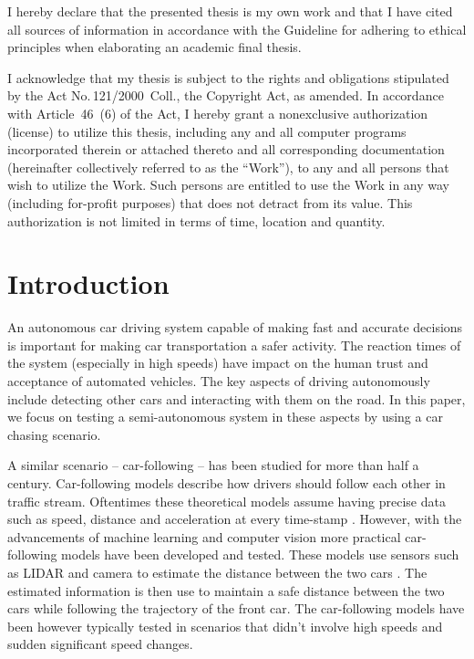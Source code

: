 \begin{declaration}
		I hereby declare that the presented thesis is my own work and that I have cited all sources of information in accordance with the Guideline for adhering to ethical principles when elaborating an academic final thesis.
		
		I acknowledge that my thesis is subject to the rights and obligations stipulated by the Act No.\,121/2000~Coll., the Copyright Act, as amended. In accordance with Article~46~(6) of the Act, I hereby grant a nonexclusive authorization (license) to utilize this thesis, including any and all computer programs incorporated therein or attached thereto and all corresponding documentation (hereinafter collectively referred to as the ``Work''), to any and all persons that wish to utilize the Work. Such persons are entitled to use the Work in any way (including for-profit purposes) that does not detract from its value. This authorization is not limited in terms of time, location and quantity.
\end{declaration}





\maketitle

\chapter{Introduction}
An autonomous car driving system capable of making fast and accurate decisions is important for making car transportation a safer activity. The reaction times of the system (especially in high speeds) have impact on the human trust and acceptance of automated vehicles. The key aspects of driving autonomously include detecting other cars and interacting with them on the road. In this paper, we focus on testing a semi-autonomous system in these aspects by using a car chasing scenario. \par

A similar scenario -- car-following -- has been studied for more than half a century. Car-following models describe how drivers should follow each other in traffic stream. Oftentimes these theoretical models assume having precise data such as speed, distance and acceleration at every time-stamp \cite{car_following}. However, with the advancements of machine learning and computer vision more practical car-following models have been developed and tested. These models use sensors such as LIDAR and camera to estimate the distance between the two cars \cite{lidar_highway}. The estimated information is then use to maintain a safe distance between the two cars while following the trajectory of the front car. The car-following models have been however typically tested in scenarios that didn't involve high speeds and sudden significant speed changes. \par
 
